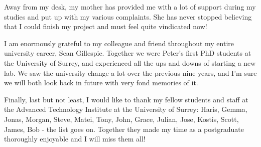 \documentclass[../thesis/thesis.tex]{subfiles}
\begin{document}
Away from my desk, my mother has provided me with a lot of support during my studies and put up with my various complaints. She has never stopped believing that I could finish my project and must feel quite vindicated now!

I am enormously grateful to my colleague and friend throughout my entire university career, Sean Gillespie. Together we were Peter's first PhD students at the University of Surrey, and experienced all the ups and downs of starting a new lab. We saw the university change a lot over the previous nine years, and I'm sure we will both look back in future with very fond memories of it.

Finally, last but not least, I would like to thank my fellow students and staff at the Advanced Technology Institute at the University of Surrey: Haris, Gemma, Jonas, Morgan, Steve, Matei, Tony, John, Grace, Julian, Jose, Kostis, Scott, James, Bob - the list goes on. Together they made my time as a postgraduate thoroughly enjoyable and I will miss them all!

\newpage
\tableofcontents
{}

\newpage
{}
\listoffigures
\newpage
{}
\listoftables

\end{document}

